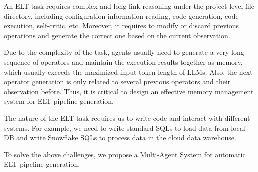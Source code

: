  An ELT task requires complex and long-link reasoning under the project-level file directory, including configuration information reading, code generation, code execution, self-critic, etc. Moreover, it requires to modify or discard previous operations and generate the correct one based on the current observation.

 Due to the complexity of the task, agents usually need to generate a very long sequence of operators and maintain the execution results together as memory, which usually exceeds the maximized input token length of LLMs. Also, the next operator generation is only related to several previous operators and their observation before. Thus, it is critical to design an effective memory management system for ELT pipeline generation.

 The nature of the ELT task requires us to write code and interact with different systems. For example, we need to write standard SQLs to load data from local DB and write Snowflake SQLs to process data in the cloud data warehouse.


To solve the above challenges, we propose a Multi-Agent System for automatic ELT pipeline generation.
